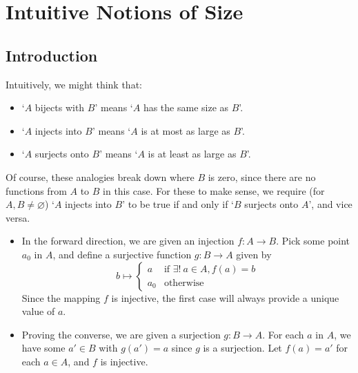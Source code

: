 \documentclass{article}
\begin{document}
	\section{Intuitive Notions of Size}
	\subsection{Introduction}
	Intuitively, we might think that:
	\begin{itemize}
		\item `$A$ bijects with $B$' means `$A$ has the same size as $B$'.
		\item `$A$ injects into $B$' means `$A$ is at most as large as $B$'.
		\item `$A$ surjects onto $B$' means `$A$ is at least as large as $B$'.
	\end{itemize}
	Of course, these analogies break down where $B$ is zero, since there are no functions from $A$ to $B$ in this case. For these to make sense, we require (for $A, B\neq\varnothing$) `$A$ injects into $B$' to be true if and only if `$B$ surjects onto $A$', and vice versa.
	\begin{itemize}
		\item In the forward direction, we are given an injection $f\colon A \to B$. Pick some point $a_0$ in $A$, and define a surjective function $g\colon B \to A$ given by
		\[ b \mapsto \begin{cases}
			a & \text{if } \exists!\ a \in A, f(a) = b \\
			a_0 & \text{otherwise}
		\end{cases} \]
		Since the mapping $f$ is injective, the first case will always provide a unique value of $a$.
		\item Proving the converse, we are given a surjection $g\colon B \to A$. For each $a$ in $A$, we have some $a' \in B$ with $g(a') = a$ since $g$ is a surjection. Let $f(a) = a'$ for each $a\in A$, and $f$ is injective.
	\end{itemize}
\end{document}
